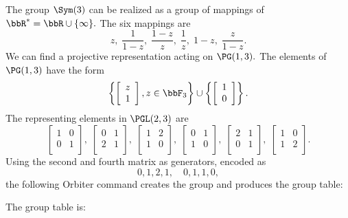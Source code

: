 The group $\Sym(3)$ can be realized 
as a group of mappings of $\bbR^*= \bbR \cup \{\infty\}.$ 
The six mappings are 
$$
z, \;
\frac{1}{1-z}, \;  
\frac{1-z}{z}, \;  
\frac{1}{z}, \;  
1 - z, \;
\frac{z}{1-z}.   
$$
We can find a projective representation acting on $\PG(1,3).$ 
The elements of $\PG(1,3)$ have the form 
$$
\left\{
\left[
\begin{array}{c}
z\\
1\\
\end{array}
\right], 
z \in \bbF_3 \right\} \cup 
\left\{
\left[
\begin{array}{c}
1\\
0\\
\end{array}
\right]
\right\}. 
$$
The representing elements in $\PGL(2,3)$ are 
$$
\left[
\begin{array}{cc}
1&0\\
0&1\\
\end{array}
\right], \;
\left[
\begin{array}{cc}
0&1\\
2&1\\
\end{array}
\right], \;
\left[
\begin{array}{cc}
1&2\\
1&0\\
\end{array}
\right], \;
\left[
\begin{array}{cc}
0&1\\
1&0\\
\end{array}
\right], \;
\left[
\begin{array}{cc}
2&1\\
0&1\\
\end{array}
\right], \;
\left[
\begin{array}{cc}
1&0\\
1&2\\
\end{array}
\right].
$$
Using the second and fourth matrix as generators, encoded as 
$$
0,1,2,1, \quad 0,1,1,0,
$$
the following Orbiter command creates the group and produces the group table:


The group table is:


